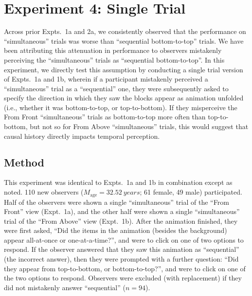 \section{Experiment 4: Single Trial}
Across prior Expts.~1a and 2a, we consistently  observed that the performance on “simultaneous” trials was worse than “sequential bottom-to-top” trials.  We have been attributing this attenuation in performance to observers mistakenly perceiving the “simultaneous” trials as “sequential bottom-to-top”.  In this experiment, we directly test this assumption by conducting a single trial version of Expts.~1a and 1b, wherein if a participant mistakenly perceived a “simultaneous” trial as a “sequential” one, they were subsequently asked to specify the direction in which they saw the blocks appear as animation unfolded (i.e., whether it was bottom-to-top, or top-to-bottom).  If they misperceive the From Front “simultaneous” trials as bottom-to-top more often than top-to-bottom, but not so for From Above “simultaneous” trials, this would suggest that causal history directly impacts temporal perception. 

\subsection{Method}
This experiment was identical to Expts.~1a and 1b in combination except as noted. 110 new observers ($M_\text{age} = \qty{32.52}{years}$; 61 female, 49 male) participated.  Half of the observers were shown a single “simultaneous” trial of the “From Front” view (Expt.~1a), and the other half were shown a single “simultaneous” trial of the “From Above” view (Expt.~1b).  After the animation finished, they were first asked, “Did the items in the animation (besides the background) appear all-at-once or one-at-a-time?”, and were to click on one of two options to respond.  If the observer answered that they saw this animation as “sequential” (the incorrect answer), then they were prompted with a further question: “Did they appear from top-to-bottom, or bottom-to-top?”, and were to click on one of the two options to respond.  Observers were excluded (with replacement) if they did not mistakenly answer “sequential” ($n = 94$). 

